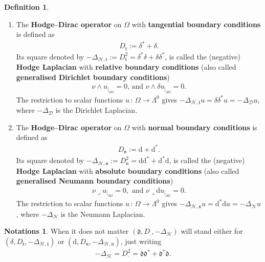 \documentclass[10pt]{amsart}
\theoremstyle{definition}\newtheorem{defi}[theo]{Definition}\newtheorem{rema}[theo]{Remark}\newtheorem{exam}[theo]{Example}\newtheorem{exem}[theo]{Example}\newtheorem{nota}[theo]{Notation}
\newcommand{\rmd}{\mathrm{d}}
\newcommand{\clH}{\mathcal{H}}
\newcommand{\clN}{\mathcal{N}}
\newcommand{\clD}{\mathcal{D}}
\newcommand{\fkn}{\mathfrak{n}}
\newcommand{\fkt}{\mathfrak{t}}
\newcommand{\fkd}{\mathfrak{d}}
\newcommand{\iprod}{\mathbin{\lrcorner}}
\newcommand*{\romanenumi}{\renewcommand*{\theenumi}{\roman{enumi}}}
\newtheorem{notas}[theo]{Notations}
\begin{document}
\pagebreak
\begin{defi}\leavevmode
\begin{enumerate}\romanenumi
\item\label{defi2.1.1} The \textbf{Hodge--Dirac operator} on $\Omega$ with \textbf{tangential boundary conditions} is defined as
\begin{align*}
D_\fkt:= \delta^\ast + \delta .
\end{align*}
Its square denoted by $-\Delta_{\clH,\fkt}:= D_\fkt^2 = \delta^\ast\delta + \delta\delta^\ast$, is called the (negative) \textbf{Hodge Laplacian} with \textbf{relative boundary conditions} (also called \textbf{generalised Dirichlet boundary conditions})
\begin{align*}
\nu\wedge u_{|_{\partial \Omega}} = 0 \text{, and } \nu\wedge \delta u_{|_{\partial \Omega}} = 0.
\end{align*}
The restriction to scalar functions $u\,:\,\Omega\longrightarrow\Lambda^0$ gives $-\Delta_{\clH,\fkt}u = \delta\delta^\ast u = -\Delta_{\clD}u$, where $-\Delta_{\clD}$ is the Dirichlet Laplacian.
\item\label{defi2.1.2} The \textbf{Hodge--Dirac operator} on $\Omega$ with \textbf{normal boundary conditions} is defined as
\begin{align*}
D_\fkn:= \rmd+\rmd^\ast .
\end{align*}
Its square denoted by $-\Delta_{\clH,\fkn}:= D_\fkn^2 = \rmd\rmd^\ast + \rmd^\ast\rmd$, is called the (negative) \textbf{Hodge Laplacian} with \textbf{absolute boundary conditions} (also called \textbf{generalised Neumann boundary conditions})
\begin{align*}
\nu\iprod u_{|_{\partial \Omega}} = 0, \text{ and } \nu\iprod \rmd u_{|_{\partial \Omega}} = 0.
\end{align*}
The restriction to scalar functions $u\,:\,\Omega\longrightarrow\Lambda^0$ gives $-\Delta_{\clH,\fkn}u = \rmd^\ast\rmd u = -\Delta_{\clN}u$, where $-\Delta_{\clN}$ is the Neumann Laplacian.
\end{enumerate}
\end{defi}

\begin{notas}
When it does not matter $(\fkd, D_{\cdot},-\Delta_\clH)$ will stand either for $(\delta, D_\fkt,-\Delta_{\clH,\fkt})$ or $(\rmd, D_\fkn,-\Delta_{\clH,\fkn})$, just writing
\begin{align*}
-\Delta_\clH = D_{\cdot}^2 = \fkd\fkd^\ast+\fkd^\ast\fkd.
\end{align*}
\end{notas}
\end{document}
